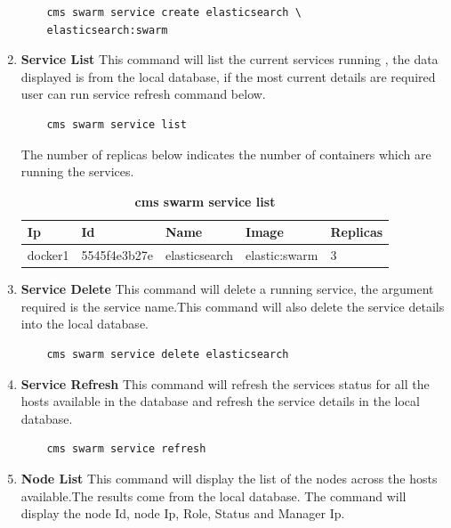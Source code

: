 \documentclass[9pt,twocolumn,twoside]{../../styles/osajnl}
\begin{document}
\begin{enumerate}
    \begin{verbatim}
    cms swarm service create elasticsearch \
    elasticsearch:swarm  
    \end{verbatim}
    
    \item \textbf{Service List}
    This command will list the current services running , the data displayed is from the local database, if the most current details are required user can run service refresh command below.\\

    \begin{verbatim}
    cms swarm service list 
    \end{verbatim}  
    
    The number of replicas below indicates the number of containers which are running the services.\\
    \begin{table}[htbp]
     \caption{\bf cms swarm service list }
     \begin{tabular}{p{1.25cm}p{1.5cm}p{1.5cm}p{1.5cm}p{.75cm}}
     \hline
      Ip & Id & Name &Image & Replicas\\
      \hline
      docker1 & 5545f4e3b27e & elasticsearch &elastic:swarm  & 3  \\
     \hline
     \end{tabular}
     \label{tab:tab7}
     \end{table}
     
    \item \textbf{Service Delete}
    This command will delete a running service, the argument required is the service name.This command will also delete the service details into the local database.\\
    
    \begin{verbatim}
    cms swarm service delete elasticsearch
    \end{verbatim} 
    
    \item \textbf{Service Refresh}
    This command will refresh the services status for all the hosts available in the database and refresh the service details in the local database.
 
    \begin{verbatim}
    cms swarm service refresh
    \end{verbatim} 
       
    \item \textbf{Node List}
    This command will display the list of the nodes across the hosts available.The results come from the local database. The command will display the node Id, node Ip, Role, Status and Manager Ip.
    

\end{enumerate}
\end{document}
